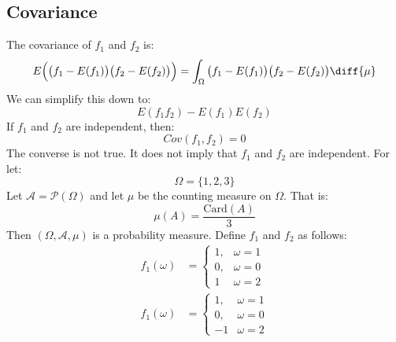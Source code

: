             \subsection{Covariance}
                The covariance of $f_{1}$ and $f_{2}$ is:
                \begin{equation}
                    E\Big(\big(f_{1}-E(f_{1})\big)
                        \big(f_{2}-E(f_{2})\big)\Big)
                    =\int_{\Omega}\big(f_{1}-E(f_{1})\big)
                        \big(f_{2}-E(f_{2})\big)\diff{\mu}
                \end{equation}
                We can simplify this down to:
                \begin{equation}
                    E(f_{1}f_{2})-E(f_{1})E(f_{2})
                \end{equation}
                If $f_{1}$ and $f_{2}$ are independent, then:
                \begin{equation}
                    Cov(f_{1},f_{2})=0
                \end{equation}
                The converse is not true. It does not imply that
                $f_{1}$ and $f_{2}$ are independent.
                For let:
                \begin{equation}
                    \Omega=\{1,2,3\}
                \end{equation}
                Let $\mathcal{A}=\mathcal{P}(\Omega)$ and let
                $\mu$ be the counting measure on $\Omega$. That is:
                \begin{equation}
                    \mu(A)=\frac{\mathrm{Card}(A)}{3}
                \end{equation}
                Then $(\Omega,\mathcal{A},\mu)$ is a probability
                measure. Define $f_{1}$ and $f_{2}$ as follows:
                \begin{align}
                    f_{1}(\omega)&=
                    \begin{cases}
                        1,&\omega=1\\
                        0,&\omega=0\\
                        1&\omega=2
                    \end{cases}\\
                    f_{1}(\omega)&=
                    \begin{cases}
                        1,&\omega=1\\
                        0,&\omega=0\\
                        \minus{1}&\omega=2
                    \end{cases}
                \end{align}
